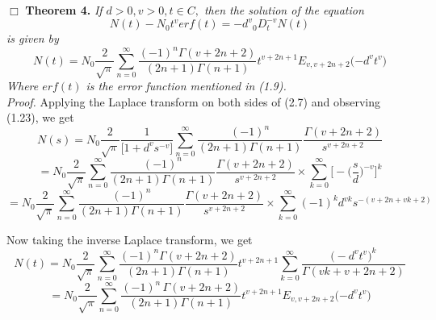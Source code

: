 \documentclass[leqno]{article}
\begin{document}
\hfill$\Box$
\medskip
\noindent
\newline
{\bf Theorem 4.}
{\it If $d > 0, v > 0, t \in C,$ then the solution of the equation
\begin{equation}
    N(t) - N_0{t^v}erf(t) = {-d^v}{_0D_t^{-v}}N(t)
\end{equation}
is given by
\begin{equation}
    N(t) = N_0
    \frac{2}{\sqrt{\pi}}
    \sum_{n = 0}^{\infty}
    \frac{{(-1)^n}\Gamma{(v+2n+2)}}{{(2n+1)}\Gamma{(n+1)}}
    t^{v+2n+1}
    E_{v,v+2n+2}
    \Big({-d^v}{t^v}\Big)
\end{equation}
Where $erf(t)$ is the error function mentioned in (1.9).
}
\vspace{0.05in}\\
%
\noindent
{\it Proof.} Applying the Laplace transform on both sides of (2.7) and observing (1.23), we get
\begin{equation*}
    N(s)=N_0
    \frac{2}{\sqrt{\pi}}
    \frac{1}{\Big[1+{d^v}{s^{-v}}\Big]}
    \sum_{n = 0}^{\infty}
    \frac{(-1)^n}{(2n+1)\Gamma{(n+1)}}
    \frac{\Gamma{(v+2n+2)}}{s^{v+2n+2}}
\end{equation*}
\begin{equation*}
    =N_0
    \frac{2}{\sqrt{\pi}}
    \sum_{n = 0}^{\infty}
    \frac{{(-1)^n}}{(2n+1)\Gamma{(n+1)}}
    \frac{\Gamma{(v+2n+2)}}{s^{v+2n+2}}
    \times
    \sum_{k=0}^{\infty}
    \bigg[
        -{\bigg(\frac{s}{d}\bigg)^{-v}}
    \bigg]^k
\end{equation*}
\begin{equation*}
    =N_0
    \frac{2}{\sqrt{\pi}}
    \sum_{n = 0}^{\infty}
    \frac{{(-1)^n}}{(2n+1)\Gamma{(n+1)}}
    \frac{\Gamma{(v+2n+2)}}{s^{v+2n+2}}
    \times
    \sum_{k=0}^{\infty}
    {(-1)^k}{d^{vk}}{s^{-(v+2n+vk+2)}}
\end{equation*}

Now taking the inverse Laplace transform, we get
\begin{equation*}
    N(t)=N_0
    \frac{2}{\sqrt{\pi}}
    \sum_{n = 0}^{\infty}
    \frac{{(-1)^n}\Gamma{(v+2n+2)}}{(2n+1)\Gamma{(n+1)}}
    t^{v+2n+1}
    {\sum_{k=0}^{\infty}}
    \frac{\big(-{d^v} {t^v}\big)^k}{\Gamma{(vk+v+2n+2)}}
\end{equation*}
\begin{equation*}
={N_0}\frac{2}{\sqrt{\pi}}
    \sum_{n = 0}^{\infty}
\frac{{(-1)^n\,\Gamma{(v+2n+2)}}}{(2n+1)\Gamma{(n+1)}}
    t^{v+2n+1}
    E_{v,v+2n+2}
    \Big({-d^v}{t^v}\Big)
\end{equation*}
\end{document}
